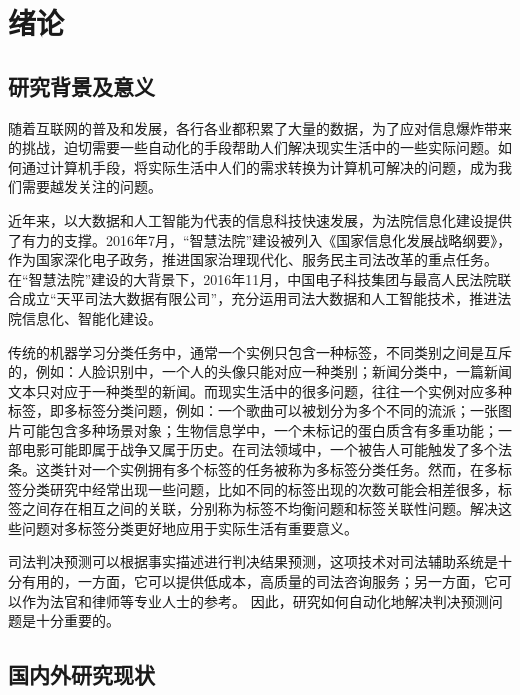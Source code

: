 
\chapter{绪论}
\section{研究背景及意义}
随着互联网的普及和发展，各行各业都积累了大量的数据，为了应对信息爆炸带来的挑战，迫切需要一些自动化的手段帮助人们解决现实生活中的一些实际问题。如何通过计算机手段，将实际生活中人们的需求转换为计算机可解决的问题，成为我们需要越发关注的问题。

近年来，以大数据和人工智能为代表的信息科技快速发展，为法院信息化建设提供了有力的支撑。2016年7月，“智慧法院”建设被列入《国家信息化发展战略纲要》，作为国家深化电子政务，推进国家治理现代化、服务民主司法改革的重点任务。在“智慧法院”建设的大背景下，2016年11月，中国电子科技集团与最高人民法院联合成立“天平司法大数据有限公司”，充分运用司法大数据和人工智能技术，推进法院信息化、智能化建设。

传统的机器学习分类任务中，通常一个实例只包含一种标签，不同类别之间是互斥的，例如：人脸识别中，一个人的头像只能对应一种类别；新闻分类中，一篇新闻文本只对应于一种类型的新闻。而现实生活中的很多问题，往往一个实例对应多种标签，即多标签分类问题，例如：一个歌曲可以被划分为多个不同的流派；一张图片可能包含多种场景对象；生物信息学中，一个未标记的蛋白质含有多重功能；一部电影可能即属于战争又属于历史。在司法领域中，一个被告人可能触发了多个法条。这类针对一个实例拥有多个标签的任务被称为多标签分类任务。然而，在多标签分类研究中经常出现一些问题，比如不同的标签出现的次数可能会相差很多，标签之间存在相互之间的关联，分别称为标签不均衡问题和标签关联性问题。解决这些问题对多标签分类更好地应用于实际生活有重要意义。

司法判决预测可以根据事实描述进行判决结果预测，这项技术对司法辅助系统是十分有用的，一方面，它可以提供低成本，高质量的司法咨询服务；另一方面，它可以作为法官和律师等专业人士的参考。 因此，研究如何自动化地解决判决预测问题是十分重要的。




\section{国内外研究现状}
